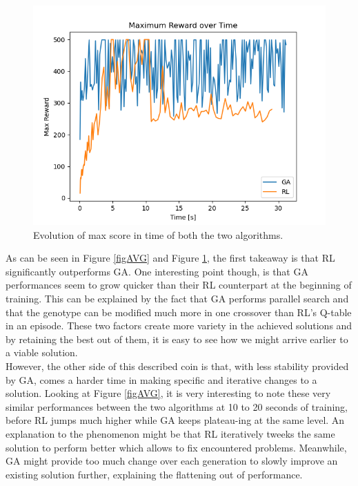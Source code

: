 \begin{figure}[H]
	\centering
	\includegraphics [scale = 0.5]{Images/RL_GA_comparison_max.png}
	\caption{Evolution of max score in time of both the two algorithms.}
	\label{figMAX}
\end{figure}

As can be seen in Figure \ref{figAVG} and Figure \ref{figMAX}, the first takeaway is that RL significantly outperforms GA.
One interesting point though, is that GA performances seem to grow quicker than their RL counterpart at the beginning of training.
This can be explained by the fact that GA performs parallel search and that the genotype can be modified much more in one crossover than RL's Q-table in an episode. 
These two factors create more variety in the achieved solutions and by retaining the best out of them, it is easy to see how we might arrive earlier to a viable solution.
\\
However, the other side of this described coin is that, with less stability provided by GA, comes a harder time in making specific and iterative changes to a solution.
Looking at Figure \ref{figAVG}, it is very interesting to note these very similar performances between the two algorithms at 10 to 20 seconds of training, before RL jumps much higher while GA keeps plateau-ing at the same level.
An explanation to the phenomenon might be that RL iteratively tweeks the same solution to perform better which allows to fix encountered problems. Meanwhile, GA might provide too much change over each generation to slowly improve an existing solution further, explaining the flattening out of performance.

